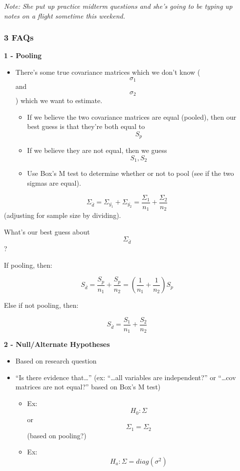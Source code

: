 \documentclass[]{article}
\providecommand{\tightlist}{%
  \setlength{\itemsep}{0pt}\setlength{\parskip}{0pt}}
\begin{document}
\emph{Note: She put up practice midterm questions and she's going to be
typing up notes on a flight sometime this weekend.}

\hypertarget{faqs}{%
\subsubsection{3 FAQs}\label{faqs}}

\textbf{1 - Pooling}

\begin{itemize}
\tightlist
\item
  There's some true covariance matrices which we don't know
  (\[\sigma_1\] and \[\sigma_2\]) which we want to estimate.

  \begin{itemize}
  \tightlist
  \item
    If we believe the two covariance matrices are equal (pooled), then
    our best guess is that they're both equal to \[S_p\]
  \item
    If we believe they are not equal, then we guess \[S_1, S_2\]
  \item
    Use Box's M test to determine whether or not to pool (see if the two
    sigmas are equal).
  \end{itemize}
\end{itemize}

\[\Sigma_{\bar{d}} = \Sigma_{\bar{y_1}} + \Sigma_{\bar{y_2}} = \frac{\Sigma_1}{n_1} + \frac{\Sigma_2}{n_2}\]
(adjusting for sample size by dividing).

What's our best guess about \[ \Sigma_{\bar{d}} \] ?

If pooling, then:

\[S_{\bar{d}} = \frac{S_p}{n_1} + \frac{S_p}{n_2} = (\frac{1}{n_1} + \frac{1}{n_2})S_p\]

Else if not pooling, then:

\[S_{\bar{d}} = \frac{S_1}{n_1} + \frac{S_2}{n_2}\]

\textbf{2 - Null/Alternate Hypotheses}

\begin{itemize}
\tightlist
\item
  Based on research question
\item
  ``Is there evidence that\ldots{}'' (ex: ``\ldots{}all variables are
  independent?'' or ``\ldots{}cov matrices are not equal?'' based on
  Box's M test)

  \begin{itemize}
  \tightlist
  \item
    Ex: \[ H_0: \Sigma \] or \[ \Sigma_1 = \Sigma_2 \] (based on
    pooling?)
  \item
    Ex: \[ H_a: \Sigma = diag(\sigma^2) \]
  \end{itemize}
\end{itemize}
\end{document}
